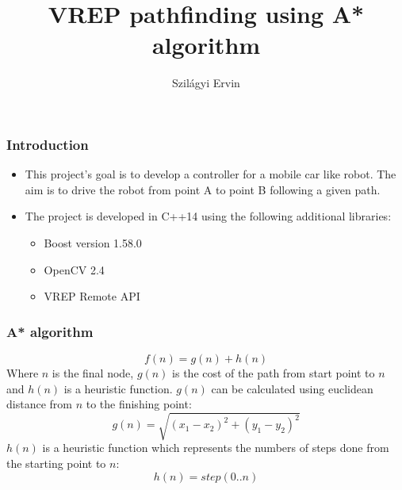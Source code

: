 \documentclass{beamer}
\title{VREP pathfinding using A* algorithm}
\author[Szilagyi Ervin]{Szil\'{a}gyi Ervin}
\institute{Sapientia EMTE}
\begin{document}
	
	\begin{frame}
		\titlepage
	\end{frame}
	
	\begin{frame}
		\frametitle{Introduction}
		\begin{itemize}
			\item This project's goal is to develop a controller for a mobile car like robot. The aim is to drive the robot from point A to point B following a given path.
			\item
			The project is developed in C++14 using the following additional libraries:
			\begin{itemize}
				\item Boost version 1.58.0
				\item OpenCV 2.4
				\item VREP Remote API 
			\end{itemize}
		\end{itemize}
	\end{frame}
	
	\begin{frame}
		\frametitle{A* algorithm}
		\begin{equation}
			f(n) = g(n) + h(n)
		\end{equation}
		Where $n$ is the final node, $g(n)$ is the cost of the path from start point to $n$ and $h(n)$ is a heuristic function.
		$g(n)$ can be calculated using euclidean distance from $n$ to the finishing point:
		\begin{equation}
		g(n) = \sqrt{(x_1 - x_2)^2 + (y_1 - y_2)^2}
		\end{equation}
		$h(n)$ is a heuristic function which represents the numbers of steps done from the starting point to $n$:
		\begin{equation}
		h(n) = step(0..n)
		\end{equation}
	\end{frame}
	
\end{document}
